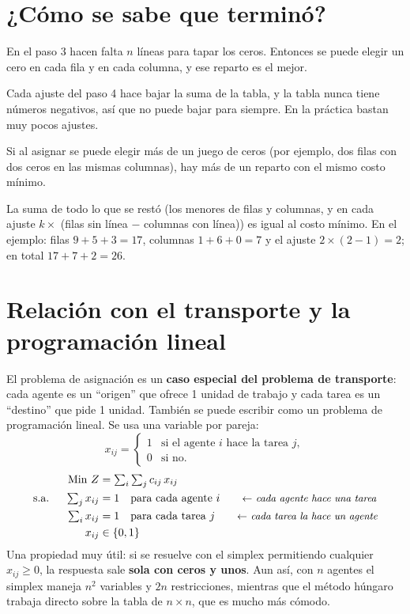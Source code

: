 \documentclass[11pt,a4paper]{article}
\begin{document}
\section{¿Cómo se sabe que terminó?}

\begin{description}[leftmargin=0pt, itemsep=5pt]
  \item[Solución óptima.] En el paso 3 hacen falta $n$ líneas para tapar los ceros. Entonces se puede elegir un cero
        en cada fila y en cada columna, y ese reparto es el mejor.
  \item[Siempre termina.] Cada ajuste del paso 4 hace bajar la suma de la tabla, y la tabla nunca tiene números
        negativos, así que no puede bajar para siempre. En la práctica bastan muy pocos ajustes.
  \item[Varias soluciones óptimas.] Si al asignar se puede elegir más de un juego de ceros (por ejemplo, dos filas con
        dos ceros en las mismas columnas), hay más de un reparto con el mismo costo mínimo.
  \item[Comprobación rápida.] La suma de todo lo que se restó (los menores de filas y columnas, y en cada ajuste
        $k \times$ (filas sin línea $-$ columnas con línea)) es igual al costo mínimo. En el ejemplo: filas $9+5+3 = 17$, columnas $1+6+0 = 7$ y el ajuste
        $2 \times (2 - 1) = 2$; en total $17 + 7 + 2 = 26$.
\end{description}

\section{Relación con el transporte y la programación lineal}

El problema de asignación es un \textbf{caso especial del problema de transporte}: cada agente es un ``origen'' que
ofrece 1 unidad de trabajo y cada tarea es un ``destino'' que pide 1 unidad. También se puede escribir como un
problema de programación lineal. Se usa una variable por pareja:
\[
x_{ij} = \begin{cases} 1 & \text{si el agente } i \text{ hace la tarea } j,\\ 0 & \text{si no.}\end{cases}
\]
\[
\begin{aligned}
\text{Min } Z &= \textstyle\sum_{i}\sum_{j} c_{ij}\, x_{ij}\\
\text{s.a. } \quad \textstyle\sum_{j} x_{ij} &= 1 \quad \text{para cada agente } i \nota{cada agente hace una tarea}\\
\textstyle\sum_{i} x_{ij} &= 1 \quad \text{para cada tarea } j \nota{cada tarea la hace un agente}\\
x_{ij} &\in \{0, 1\}
\end{aligned}
\]
Una propiedad muy útil: si se resuelve con el simplex permitiendo cualquier $x_{ij} \ge 0$, la respuesta sale
\textbf{sola con ceros y unos}. Aun así, con $n$ agentes el simplex maneja $n^2$ variables y $2n$ restricciones,
mientras que el método húngaro trabaja directo sobre la tabla de $n \times n$, que es mucho más cómodo.
\end{document}

